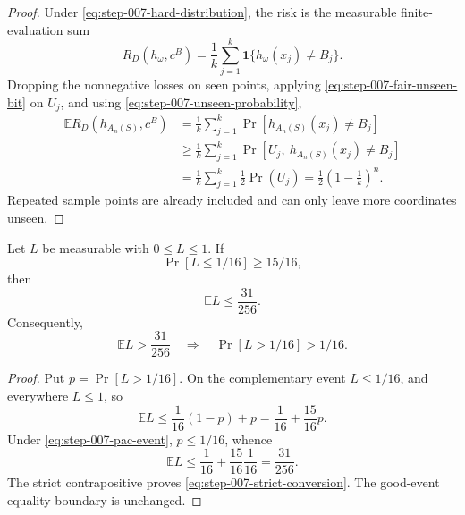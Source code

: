 \begin{proof}
Under \eqref{eq:step-007-hard-distribution}, the risk is the measurable
finite-evaluation sum
\begin{equation}\label{eq:step-007-finite-risk}
R_D(h_\omega,c^B)
=\frac1k\sum_{j=1}^k
\mathbf1\{h_\omega(x_j)\ne B_j\}.
\end{equation}
Dropping the nonnegative losses on seen points, applying
\eqref{eq:step-007-fair-unseen-bit} on \(U_j\), and using
\eqref{eq:step-007-unseen-probability},
\begin{equation}\label{eq:step-007-risk-sum}
\begin{split}
\mathbb ER_D(h_{A_n(S)},c^B)
&=\frac1k\sum_{j=1}^k
\Pr[h_{A_n(S)}(x_j)\ne B_j]\\
&\ge\frac1k\sum_{j=1}^k
\Pr[U_j,\ h_{A_n(S)}(x_j)\ne B_j]\\
&=\frac1k\sum_{j=1}^k\frac12\Pr(U_j)
=\frac12\left(1-\frac1k\right)^n.
\end{split}
\end{equation}
Repeated sample points are already included and can only leave more
coordinates unseen.
\end{proof}

\begin{lemma}
\label{lem:step-007-pac-conversion}
Let \(L\) be measurable with \(0\le L\le1\).  If
\begin{equation}\label{eq:step-007-pac-event}
\Pr[L\le1/16]\ge15/16,
\end{equation}
then
\begin{equation}\label{eq:step-007-expectation-ceiling}
\mathbb EL\le\frac{31}{256}.
\end{equation}
Consequently,
\begin{equation}\label{eq:step-007-strict-conversion}
\mathbb EL>\frac{31}{256}
\quad\Longrightarrow\quad
\Pr[L>1/16]>1/16.
\end{equation}
\end{lemma}

\begin{proof}
Put \(p=\Pr[L>1/16]\).  On the complementary event \(L\le1/16\), and
everywhere \(L\le1\), so
\begin{equation}\label{eq:step-007-loss-split}
\mathbb EL\le\frac1{16}(1-p)+p
=\frac1{16}+\frac{15}{16}p.
\end{equation}
Under \eqref{eq:step-007-pac-event}, \(p\le1/16\), whence
\[
\mathbb EL\le\frac1{16}+\frac{15}{16}\frac1{16}
=\frac{31}{256}.
\]
The strict contrapositive proves \eqref{eq:step-007-strict-conversion}.
The good-event equality boundary is unchanged.
\end{proof}

